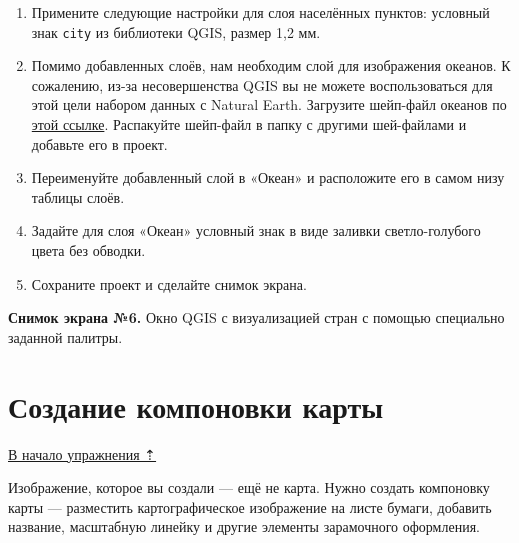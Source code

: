 \documentclass[
  12pt,
]{book}
\begin{document}
\begin{enumerate}
\def\labelenumi{\arabic{enumi}.}
\setcounter{enumi}{5}
\item
  Примените следующие настройки для слоя населённых пунктов: условный знак \texttt{city} из библиотеки QGIS, размер 1,2 мм.
\item
  Помимо добавленных слоёв, нам необходим слой для изображения океанов. К сожалению, из-за несовершенства QGIS вы не можете воспользоваться для этой цели набором данных с Natural Earth. Загрузите шейп-файл океанов по \href{https://1drv.ms/u/s!AmtmZDq3JgxHgZswh2sFnErE-JEmGw?e=xoZW4c}{этой ссылке}. Распакуйте шейп-файл в папку с другими шей-файлами и добавьте его в проект.
\item
  Переименуйте добавленный слой в «Океан» и расположите его в самом низу таблицы слоёв.
\item
  Задайте для слоя «Океан» условный знак в виде заливки светло-голубого цвета без обводки.
\item
  Сохраните проект и сделайте снимок экрана.
\end{enumerate}

\textbf{Снимок экрана №6.} Окно QGIS с визуализацией стран с помощью специально заданной палитры.

\hypertarget{map-design-world-layout}{%
\section{Создание компоновки карты}\label{map-design-world-layout}}

\protect\hyperlink{map-design-world}{В начало упражнения ⇡}

Изображение, которое вы создали --- ещё не карта. Нужно создать компоновку карты --- разместить картографическое изображение на листе бумаги, добавить название, масштабную линейку и другие элементы зарамочного оформления.
\end{document}
